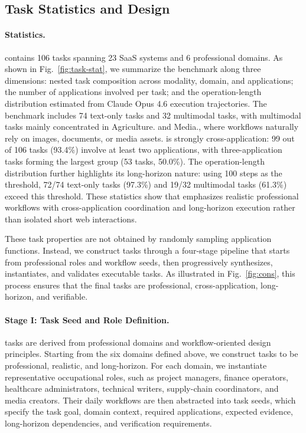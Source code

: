 \subsection{Task Statistics and Design}
\label{saas-task}

\paragraph{Statistics.}
\datasetname contains 106 tasks spanning 23 SaaS systems and 6 professional domains. As shown in Fig.~\ref{fig:task-stat}, we summarize the benchmark along three dimensions: nested task composition across modality, domain, and applications; the number of applications involved per task; and the operation-length distribution estimated from Claude Opus 4.6 execution trajectories. The benchmark includes 74 text-only tasks and 32 multimodal tasks, with multimodal tasks mainly concentrated in Agriculture. and Media., where workflows naturally rely on images, documents, or media assets. \datasetname is strongly cross-application: 99 out of 106 tasks (93.4\%) involve at least two applications, with three-application tasks forming the largest group (53 tasks, 50.0\%). The operation-length distribution further highlights its long-horizon nature: using 100 steps as the threshold, 72/74 text-only tasks (97.3\%) and 19/32 multimodal tasks (61.3\%) exceed this threshold. These statistics show that \datasetname emphasizes realistic professional workflows with cross-application coordination and long-horizon execution rather than isolated short web interactions.

These task properties are not obtained by randomly sampling application functions. Instead, we construct tasks through a four-stage pipeline that starts from professional roles and workflow seeds, then progressively synthesizes, instantiates, and validates executable tasks. As illustrated in Fig.~\ref{fig:cons}, this process ensures that the final tasks are professional, cross-application, long-horizon, and verifiable.

\paragraph{Stage I: Task Seed and Role Definition.}
\datasetname tasks are derived from professional domains and workflow-oriented design principles. Starting from the six domains defined above, we construct tasks to be professional, realistic, and long-horizon. For each domain, we instantiate representative occupational roles, such as project managers, finance operators, healthcare administrators, technical writers, supply-chain coordinators, and media creators. Their daily workflows are then abstracted into task seeds, which specify the task goal, domain context, required applications, expected evidence, long-horizon dependencies, and verification requirements.


